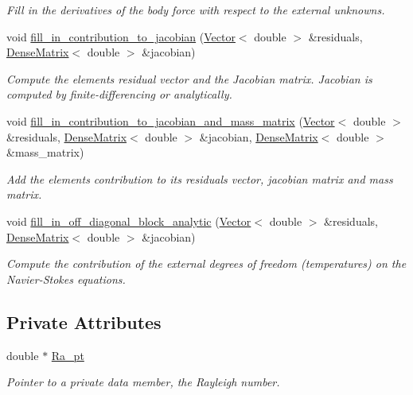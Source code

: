 \begin{DoxyCompactItemize}
\begin{DoxyCompactList}\small\item\em Fill in the derivatives of the body force with respect to the external unknowns. \end{DoxyCompactList}\item 
void \hyperlink{classoomph_1_1NavierStokesBoussinesqElement_a01483469b070309aeb8948273b974feb}{fill\+\_\+in\+\_\+contribution\+\_\+to\+\_\+jacobian} (\hyperlink{classoomph_1_1Vector}{Vector}$<$ double $>$ \&residuals, \hyperlink{classoomph_1_1DenseMatrix}{Dense\+Matrix}$<$ double $>$ \&jacobian)
\begin{DoxyCompactList}\small\item\em Compute the element\textquotesingle{}s residual vector and the Jacobian matrix. Jacobian is computed by finite-\/differencing or analytically. \end{DoxyCompactList}\item 
void \hyperlink{classoomph_1_1NavierStokesBoussinesqElement_a6c6cc7f75f0f9d61574293648bc4f148}{fill\+\_\+in\+\_\+contribution\+\_\+to\+\_\+jacobian\+\_\+and\+\_\+mass\+\_\+matrix} (\hyperlink{classoomph_1_1Vector}{Vector}$<$ double $>$ \&residuals, \hyperlink{classoomph_1_1DenseMatrix}{Dense\+Matrix}$<$ double $>$ \&jacobian, \hyperlink{classoomph_1_1DenseMatrix}{Dense\+Matrix}$<$ double $>$ \&mass\+\_\+matrix)
\begin{DoxyCompactList}\small\item\em Add the element\textquotesingle{}s contribution to its residuals vector, jacobian matrix and mass matrix. \end{DoxyCompactList}\item 
void \hyperlink{classoomph_1_1NavierStokesBoussinesqElement_a342613c3ceeaf4b5bb86c77dc150372d}{fill\+\_\+in\+\_\+off\+\_\+diagonal\+\_\+block\+\_\+analytic} (\hyperlink{classoomph_1_1Vector}{Vector}$<$ double $>$ \&residuals, \hyperlink{classoomph_1_1DenseMatrix}{Dense\+Matrix}$<$ double $>$ \&jacobian)
\begin{DoxyCompactList}\small\item\em Compute the contribution of the external degrees of freedom (temperatures) on the Navier-\/\+Stokes equations. \end{DoxyCompactList}\end{DoxyCompactItemize}
\subsection*{Private Attributes}
\begin{DoxyCompactItemize}
\item 
double $\ast$ \hyperlink{classoomph_1_1NavierStokesBoussinesqElement_a0f1c9b6947324c4d5386b9b68abba2d1}{Ra\+\_\+pt}
\begin{DoxyCompactList}\small\item\em Pointer to a private data member, the Rayleigh number. \end{DoxyCompactList}\end{DoxyCompactItemize}
